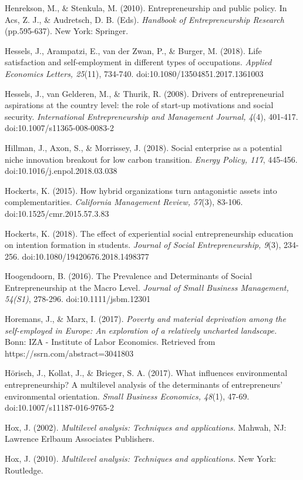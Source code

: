 \documentclass{article}
\begin{document}
Henrekson, M., \& Stenkula, M. (2010). Entrepreneurship and public policy. In Acs, Z. J., \& Audretsch, D. B. (Eds). \emph{Handbook of Entrepreneurship Research} (pp.595-637). New York: Springer.

Hessels, J., Arampatzi, E., van der Zwan, P., \& Burger, M. (2018). Life satisfaction and self-employment in different types of occupations. \emph{Applied}\emph{ }\emph{Economics}\emph{ Letters, 25}(11), 734-740. doi:10.1080/13504851.2017.1361003

Hessels, J., van Gelderen, M., \& Thurik, R. (2008). Drivers of entrepreneurial aspirations at the country level: the role of start-up motivations and social security. \emph{International Entrepreneurship and Management Journal, 4}(4), 401-417. doi:10.1007/s11365-008-0083-2 

Hillman, J., Axon, S., \& Morrissey, J. (2018). Social enterprise as a potential niche innovation breakout for low carbon transition. \emph{Energy Policy, 117}, 445-456. doi:10.1016/j.enpol.2018.03.038

Hockerts, K. (2015). How hybrid organizations turn antagonistic assets into complementarities. \emph{California Management Review, 57}(3), 83-106. doi:10.1525/cmr.2015.57.3.83

Hockerts, K. (2018). The effect of experiential social entrepreneurship education on intention formation in students. \emph{Journal of Social Entrepreneurship, 9}(3), 234-256. doi:10.1080/19420676.2018.1498377

Hoogendoorn, B. (2016). The Prevalence and Determinants of Social Entrepreneurship at the Macro Level. \emph{Journal of Small Business Management, 54(S1)}, 278-296. doi:10.1111/jsbm.12301

Horemans, J., \& Marx, I. (2017). \emph{Poverty and material deprivation among the self-employed in Europe: An exploration of a relatively uncharted landscape.} Bonn: IZA - Institute of Labor Economics. Retrieved from https://ssrn.com/abstract=3041803 

Hörisch, J., Kollat, J., \& Brieger, S. A. (2017). What influences environmental entrepreneurship? A multilevel analysis of the determinants of entrepreneurs' environmental orientation. \emph{Small Business Economics, 48}(1), 47-69. doi:10.1007/s11187-016-9765-2

Hox, J. (2002). \emph{Multilevel analysis: Techniques and applications. }Mahwah, NJ: Lawrence Erlbaum Associates Publishers.

Hox, J. (2010). \emph{Multilevel analysis: Techniques and applications. }New York: Routledge.
\end{document}
